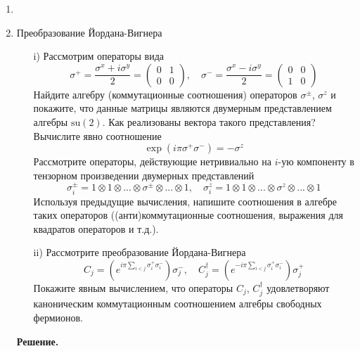 \documentclass[12pt]{article}
\theoremstyle{definition}
\begin{document}
\begin{enumerate}
    \item 
    \item Преобразование Йордана-Вигнера
    \begin{itemize}
        \item[i)] Рассмотрим операторы вида
        \begin{equation}
            \sigma^+=\frac{\sigma^x+i\sigma^y}{2}=\begin{pmatrix}
                0 & 1\\
                0 & 0
            \end{pmatrix},\quad\sigma^-=\frac{\sigma^x-i\sigma^y}{2}=\begin{pmatrix}
                0 & 0\\
                1 & 0
            \end{pmatrix}
        \end{equation}
        Найдите алгебру (коммутационные соотношения) операторов $\sigma^\pm$, $\sigma^z$ и покажите, что данные матрицы являются двумерным представлением алгебры $\text{su}(2)$. Как реализованы вектора такого представления? Вычислите явно соотношение
        \begin{equation}
            \exp(i\pi\sigma^+\sigma^-)=-\sigma^z
        \end{equation}
        Рассмотрите операторы, действующие нетривиально на $i$-ую компоненту в тензорном произведении двумерных представлений
        \begin{equation}
            \sigma^\pm_i=1\otimes1\otimes...\otimes\sigma^\pm\otimes...\otimes1,\quad\sigma^z_i=1\otimes1\otimes...\otimes\sigma^z\otimes...\otimes1
        \end{equation}
        Используя предыдущие вычисления, напишите соотношения в алгебре таких операторов ((анти)коммутационные соотношения, выражения для квадратов операторов и т.д.).
        \item[ii)] Рассмотрите преобразование Йордана-Вигнера
        \begin{equation}
            C_j=\left(e^{i\pi\sum\limits_{i<j}\sigma^+_i\sigma^-_i}\right)\sigma_j^-,\quad C^\dagger_j=\left(e^{-i\pi\sum\limits_{i<j}\sigma^+_i\sigma^-_i}\right)\sigma_j^+
        \end{equation}
        Покажите явным вычислением, что операторы $C_j$, $C_j^\dagger$ удовлетворяют каноническим коммутационным соотношением алгебры свободных фермионов.
    \end{itemize}
    \textbf{Решение.}

\end{enumerate}
\end{document}
